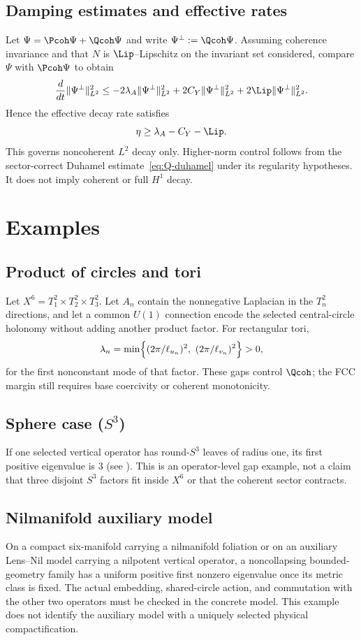 \documentclass[11pt]{article}
\newcommand{\Xsix}{\ensuremath{X^{6}}}
\newcommand{\Aop}{A}
\newcommand{\Ltwo}{\ensuremath{L^{2}}}
\providecommand{\FPpdf}[2]{\texorpdfstring{#1}{#2}}
\begin{document}
\subsection{Damping estimates and effective rates}
Let $\Psi=\Pcoh\Psi+\Qcoh\Psi$ and write $\Psi^\perp:=\Qcoh\Psi$.
Assuming coherence invariance and that $N$ is $\Lip$--Lipschitz on the
invariant set considered, compare $\Psi$ with $\Pcoh\Psi$ to obtain
\[
\frac{d}{dt}\|\Psi^\perp\|_{\Ltwo}^{2}
\le -2\lambda_{\Aop}\|\Psi^\perp\|_{\Ltwo}^{2} + 2C_Y\|\Psi^\perp\|_{\Ltwo}^{2} + 2\Lip \|\Psi^\perp\|_{\Ltwo}^{2}.
\]
Hence the effective decay rate satisfies
\begin{equation}\label{eq:eta}
\eta \ge \lambda_{\Aop}-C_Y-\Lip.
\end{equation}
This governs noncoherent $\Ltwo$ decay only. Higher-norm control follows from
the sector-correct Duhamel estimate~\eqref{eq:Q-duhamel} under its regularity
hypotheses. It does not imply coherent or full $H^1$ decay.

\section{Examples}

\subsection{Product of circles and tori}
Let $\Xsix=T^2_1\times T^2_2\times T^2_3$. Let $A_n$ contain the
nonnegative Laplacian in the $T_n^2$ directions, and let a common $U(1)$
connection encode the selected central-circle holonomy without adding another
product factor. For rectangular tori,
\[
\lambda_n
=\min\Bigl\{(2\pi/\ell_{u_n})^2,\ (2\pi/\ell_{v_n})^2\Bigr\}
>0,
\]
for the first nonconstant mode of that factor. These gaps control $\Qcoh$;
the FCC margin still requires base coercivity or coherent monotonicity.

\subsection{Sphere case (\FPpdf{$S^3$}{S3})}
If one selected vertical operator has round-$S^3$ leaves of radius one, its
first positive eigenvalue is $3$ (see \cite{Chavel1984}). This is an
operator-level gap example, not a claim that three disjoint $S^3$ factors fit
inside $\Xsix$ or that the coherent sector contracts.

\subsection{Nilmanifold auxiliary model}
On a compact six-manifold carrying a nilmanifold foliation or on an auxiliary
Lens--Nil model carrying a nilpotent vertical operator, a noncollapsing
bounded-geometry family has a
uniform positive first nonzero eigenvalue once its metric class is fixed. The
actual embedding, shared-circle action, and commutation with the other two
operators must be checked in the concrete model. This example does not identify
the auxiliary model with a uniquely selected physical compactification.
\end{document}
